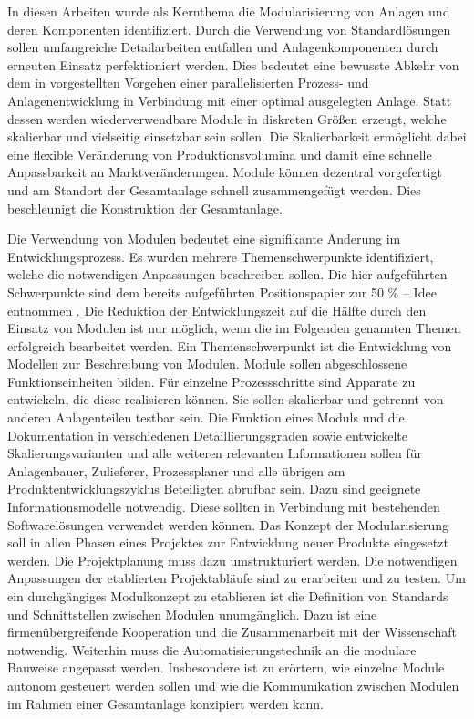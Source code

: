 In diesen Arbeiten wurde als Kernthema die Modularisierung von Anlagen und deren Komponenten identifiziert. Durch die Verwendung von Standardl\"osungen sollen umfangreiche Detailarbeiten entfallen und Anlagenkomponenten durch erneuten Einsatz perfektioniert werden. Dies bedeutet eine bewusste Abkehr von dem in \cite{Dietz_2000} vorgestellten Vorgehen einer parallelisierten Prozess- und Anlagenentwicklung in Verbindung mit einer optimal ausgelegten Anlage. Statt dessen werden wiederverwendbare Module in diskreten Gr\"o\ss{}en erzeugt, welche skalierbar und vielseitig einsetzbar sein sollen. Die Skalierbarkeit erm\"oglicht dabei eine flexible Ver\"anderung von Produktionsvolumina und damit eine schnelle Anpassbarkeit an Marktver\"anderungen. Module k\"onnen dezentral vorgefertigt und am Standort der Gesamtanlage schnell zusammengef\"ugt werden. Dies beschleunigt die Konstruktion der Gesamtanlage. \par

Die Verwendung von Modulen bedeutet eine signifikante \"Anderung im Entwicklungsprozess. Es wurden mehrere Themenschwerpunkte identifiziert, welche die notwendigen Anpassungen beschreiben sollen. Die hier aufgef\"uhrten Schwerpunkte sind dem bereits aufgef\"uhrten Positionspapier zur 50 \% -- Idee entnommen \cite{Processnet_2010}.  Die Reduktion der Entwicklungszeit auf die H\"alfte durch den Einsatz von Modulen ist nur m\"oglich, wenn die im Folgenden genannten Themen erfolgreich bearbeitet werden. \newline
Ein Themenschwerpunkt ist die Entwicklung von Modellen zur Beschreibung von Modulen. Module sollen abgeschlossene Funktionseinheiten bilden. F\"ur einzelne Prozessschritte sind Apparate zu entwickeln, die diese realisieren k\"onnen. Sie sollen skalierbar und getrennt von anderen Anlagenteilen testbar sein. \newline
Die Funktion eines Moduls und die Dokumentation in verschiedenen Detaillierungsgraden sowie entwickelte Skalierungsvarianten und alle weiteren relevanten Informationen sollen f\"ur Anlagenbauer, Zulieferer, Prozessplaner und alle \"ubrigen am Produktentwicklungszyklus Beteiligten abrufbar sein. Dazu sind geeignete Informationsmodelle notwendig. Diese sollten in Verbindung mit bestehenden Softwarel\"osungen verwendet werden k\"onnen. \cite{Processnet_2010}\newline
Das Konzept der Modularisierung soll in allen Phasen eines Projektes zur Entwicklung neuer Produkte eingesetzt werden. Die Projektplanung muss dazu umstrukturiert werden. Die notwendigen Anpassungen der etablierten Projektabl\"aufe sind zu erarbeiten und zu testen. \cite{Processnet_2010} \newline
Um ein durchg\"angiges Modulkonzept zu etablieren ist die Definition von Standards und Schnittstellen zwischen Modulen unumg\"anglich. Dazu ist eine firmen\"ubergreifende Kooperation und die Zusammenarbeit mit der Wissenschaft notwendig. \cite{Processnet_2010} \newline
Weiterhin muss die Automatisierungstechnik an die modulare Bauweise angepasst werden. Insbesondere ist zu er\"ortern, wie einzelne Module autonom gesteuert werden sollen und wie die Kommunikation zwischen Modulen im Rahmen einer Gesamtanlage konzipiert werden kann. \cite{Processnet_2010}


